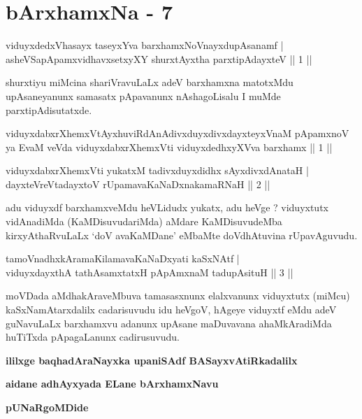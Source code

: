 \chapter{bArxhamxNa - 7}

\begin{shl}
viduyxdedxVhasayx taseyxYva barxhamxNoV\s nayxdupAsanamf | \\
asheVSapApamxvidhavxsetxyXY shurxtAyx\s tha parxtipAdayxteV \hfill ||  1 || 
\end{shl}

\begin{artha}
shurxtiyu miMcina shariVravuLaLx adeV barxhamxna matotxMdu upAsaneyanunx samasatx pApavanunx nAshagoLisalu I muMde parxtipAdisutatxde.
\end{artha}

\begin{shl}
viduyxdabxrXhemxVtAyxhuviRdAnAdivxduyxdivxdayxteyxVnaM pApamxnoV ya EvaM veVda viduyxdabxrXhemxVti viduyxdedhxyXVva barxhamx || 1 ||
\end{shl}


\begin{shl}
viduyxdabxrXhemxVti yukatxM tadivxduyxdidhx sAyxdivxdAnataH | \\
dayxteVreVtadayxtoV rUpamavaKaNaDxnakamaRNaH \hfill ||  2 || 
\end{shl}

\begin{artha}
adu viduyxdf barxhamxveMdu heVLidudx yukatx, adu heVge ? viduyxtutx vidAnadiMda (KaMDisuvudariMda) aMdare KaMDisuvudeMba kirxyAthaRvuLaLx `doV avaKaMDane' eMbaMte doVdhAtuvina rUpavAguvudu.
\end{artha}

\begin{shl}
tamoV\s nadhxkAramaKilamavaKaNaDxyati kaSxNAtf  | \\
viduyxdayxthA tathA\s samxtatxH pApAmxnaM tadupAsituH \hfill ||  3 ||
\end{shl}

\begin{artha}
moVDada aMdhakAraveMbuva tamasasxnunx elalxvanunx viduyxtutx (miMcu) kaSxNamAtarxdalilx cadarisuvudu idu heVgoV, hAgeye viduyxtf eMdu adeV guNavuLaLx barxhamxvu adanunx upAsane maDuvavana ahaMkAradiMda huTiTxda pApagaLanunx cadirusuvudu.
\end{artha}

\begin{center}
{\bf ililxge baqhadAraNayxka upaniSAdf BASayxvAtiRkadalilx}
\smallskip

{\bf aidane adhAyxyada ELane bArxhamxNavu}
\smallskip

{\bf pUNaRgoMDide}
\end{center}
